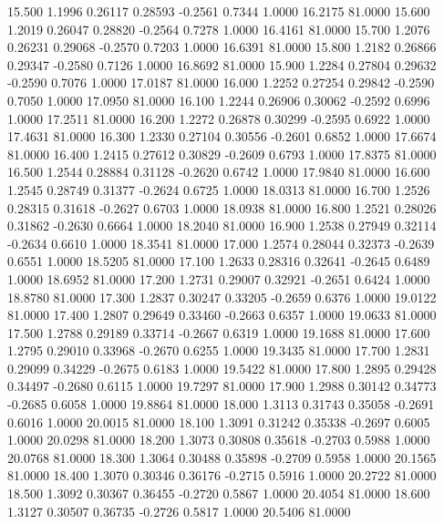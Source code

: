   15.500   1.1996   0.26117   0.28593  -0.2561   0.7344   1.0000  16.2175  81.0000
  15.600   1.2019   0.26047   0.28820  -0.2564   0.7278   1.0000  16.4161  81.0000
  15.700   1.2076   0.26231   0.29068  -0.2570   0.7203   1.0000  16.6391  81.0000
  15.800   1.2182   0.26866   0.29347  -0.2580   0.7126   1.0000  16.8692  81.0000
  15.900   1.2284   0.27804   0.29632  -0.2590   0.7076   1.0000  17.0187  81.0000
  16.000   1.2252   0.27254   0.29842  -0.2590   0.7050   1.0000  17.0950  81.0000
  16.100   1.2244   0.26906   0.30062  -0.2592   0.6996   1.0000  17.2511  81.0000
  16.200   1.2272   0.26878   0.30299  -0.2595   0.6922   1.0000  17.4631  81.0000
  16.300   1.2330   0.27104   0.30556  -0.2601   0.6852   1.0000  17.6674  81.0000
  16.400   1.2415   0.27612   0.30829  -0.2609   0.6793   1.0000  17.8375  81.0000
  16.500   1.2544   0.28884   0.31128  -0.2620   0.6742   1.0000  17.9840  81.0000
  16.600   1.2545   0.28749   0.31377  -0.2624   0.6725   1.0000  18.0313  81.0000
  16.700   1.2526   0.28315   0.31618  -0.2627   0.6703   1.0000  18.0938  81.0000
  16.800   1.2521   0.28026   0.31862  -0.2630   0.6664   1.0000  18.2040  81.0000
  16.900   1.2538   0.27949   0.32114  -0.2634   0.6610   1.0000  18.3541  81.0000
  17.000   1.2574   0.28044   0.32373  -0.2639   0.6551   1.0000  18.5205  81.0000
  17.100   1.2633   0.28316   0.32641  -0.2645   0.6489   1.0000  18.6952  81.0000
  17.200   1.2731   0.29007   0.32921  -0.2651   0.6424   1.0000  18.8780  81.0000
  17.300   1.2837   0.30247   0.33205  -0.2659   0.6376   1.0000  19.0122  81.0000
  17.400   1.2807   0.29649   0.33460  -0.2663   0.6357   1.0000  19.0633  81.0000
  17.500   1.2788   0.29189   0.33714  -0.2667   0.6319   1.0000  19.1688  81.0000
  17.600   1.2795   0.29010   0.33968  -0.2670   0.6255   1.0000  19.3435  81.0000
  17.700   1.2831   0.29099   0.34229  -0.2675   0.6183   1.0000  19.5422  81.0000
  17.800   1.2895   0.29428   0.34497  -0.2680   0.6115   1.0000  19.7297  81.0000
  17.900   1.2988   0.30142   0.34773  -0.2685   0.6058   1.0000  19.8864  81.0000
  18.000   1.3113   0.31743   0.35058  -0.2691   0.6016   1.0000  20.0015  81.0000
  18.100   1.3091   0.31242   0.35338  -0.2697   0.6005   1.0000  20.0298  81.0000
  18.200   1.3073   0.30808   0.35618  -0.2703   0.5988   1.0000  20.0768  81.0000
  18.300   1.3064   0.30488   0.35898  -0.2709   0.5958   1.0000  20.1565  81.0000
  18.400   1.3070   0.30346   0.36176  -0.2715   0.5916   1.0000  20.2722  81.0000
  18.500   1.3092   0.30367   0.36455  -0.2720   0.5867   1.0000  20.4054  81.0000
  18.600   1.3127   0.30507   0.36735  -0.2726   0.5817   1.0000  20.5406  81.0000
